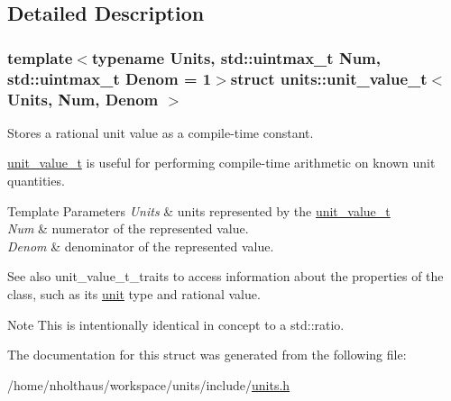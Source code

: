 \subsection{Detailed Description}
\subsubsection*{template$<$typename Units, std\+::uintmax\+\_\+t Num, std\+::uintmax\+\_\+t Denom = 1$>$struct units\+::unit\+\_\+value\+\_\+t$<$ Units, Num, Denom $>$}

Stores a rational unit value as a compile-\/time constant. 

\hyperlink{structunits_1_1unit__value__t}{unit\+\_\+value\+\_\+t} is useful for performing compile-\/time arithmetic on known unit quantities. 
\begin{DoxyTemplParams}{Template Parameters}
{\em Units} & units represented by the {\ttfamily \hyperlink{structunits_1_1unit__value__t}{unit\+\_\+value\+\_\+t}} \\
\hline
{\em Num} & numerator of the represented value. \\
\hline
{\em Denom} & denominator of the represented value. \\
\hline
\end{DoxyTemplParams}
\begin{DoxySeeAlso}{See also}
unit\+\_\+value\+\_\+t\+\_\+traits to access information about the properties of the class, such as it\textquotesingle{}s \hyperlink{structunits_1_1unit}{unit} type and rational value. 
\end{DoxySeeAlso}
\begin{DoxyNote}{Note}
This is intentionally identical in concept to a {\ttfamily std\+::ratio}. 
\end{DoxyNote}


The documentation for this struct was generated from the following file\+:\begin{DoxyCompactItemize}
\item 
/home/nholthaus/workspace/units/include/\hyperlink{units_8h}{units.\+h}\end{DoxyCompactItemize}
